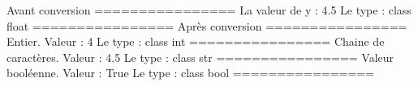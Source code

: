 \documentclass[letterpaper,10pt,french]{sphinxmanual}
\begin{document}
\begin{sphinxVerbatim}[commandchars=\\\{\}]
			Avant conversion
================
La valeur de y : 4.5 			Le type : \PYGZlt{}class \PYGZsq{}float\PYGZsq{}\PYGZgt{}
================
			Après conversion
================
Entier. 		Valeur : 4 	Le type : \PYGZlt{}class \PYGZsq{}int\PYGZsq{}\PYGZgt{}
================
Chaine de caractères. 	Valeur : 4.5 	Le type : \PYGZlt{}class \PYGZsq{}str\PYGZsq{}\PYGZgt{}
================
Valeur booléenne. 	Valeur : True 	Le type : \PYGZlt{}class \PYGZsq{}bool\PYGZsq{}\PYGZgt{}
================
\end{sphinxVerbatim}

\begin{sphinxVerbatim}[commandchars=\\\{\}]
  
  
  
  



\end{sphinxVerbatim}
\end{document}
